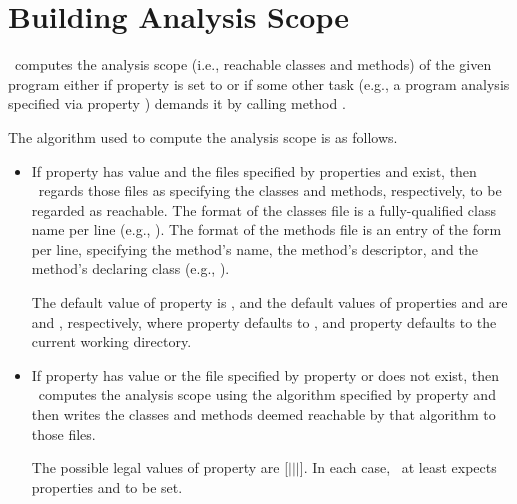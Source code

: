 \section{Building Analysis Scope}
\label{sec:building-scope}

\Chord\ computes the analysis scope (i.e., reachable classes and methods) of the given program
either if property  is set to  or if some other task (e.g.,
a program analysis specified via property ) demands it by
calling method .

The algorithm used to compute the analysis scope is as follows.

\begin{itemize}
\item
If property  has value  and the files specified by properties
 and  exist,
then \Chord\ regards those files as specifying the classes and methods, respectively,
to be regarded as reachable.  The format
of the classes file is a fully-qualified class name per line (e.g., ).  The format
of the methods file is an entry of the form  per line,
specifying the method's name, the method's descriptor, and the method's declaring class
(e.g., \code{main:([Ljava/lang/String;)V@foo.bar.Main}).

The default value of property  is , and
the default values of properties  and  are
 and , respectively,
where property  defaults to ,
and property  defaults to the current working directory.

\item
If property  has value  or the file specified by
property  or  does not exist,
then \Chord\ computes the analysis scope
using the algorithm specified by property  and
then writes the classes and methods deemed reachable by that algorithm to those files.

The possible legal values of property  are [$|$$|$$|$].
In each case, \Chord\ at least expects properties  and 
to be set.


\end{itemize}
